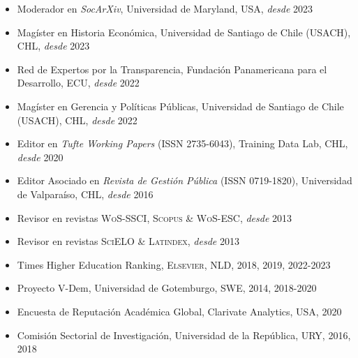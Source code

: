 





\begin{publications}

\begin{itemize}
\item{\small Moderador en {\itshape SocArXiv}, Universidad de Maryland, USA, {\itshape desde} 2023}
\item{\small Magíster en Historia Económica, Universidad de Santiago de Chile (USACH), CHL, {\itshape desde} 2023}
\item{\small Red de Expertos por la Transparencia, Fundación Panamericana para el Desarrollo, ECU, {\itshape desde} 2022}
\item{\small Magíster en Gerencia y Políticas Públicas, Universidad de Santiago de Chile (USACH), CHL, {\itshape desde} 2022}
\item{\small Editor en {\itshape Tufte Working Papers} (ISSN 2735-6043), Training Data Lab, CHL, {\itshape desde} 2020}
\item{\small Editor Asociado en {\itshape Revista de Gestión Pública} (ISSN 0719-1820), Universidad de Valparaíso, CHL, {\itshape desde} 2016}
\item{\small Revisor en revistas {\scshape WoS-SSCI}, {\scshape Scopus} \& {\scshape WoS-ESC}, {\itshape desde} 2013}
\item{\small Revisor en revistas {\scshape SciELO} \& {\scshape Latindex}, {\itshape desde} 2013}
\item{\small Times Higher Education Ranking, {\scshape Elsevier}, NLD, 2018, 2019, 2022-2023}
\item{\small Proyecto V-Dem, Universidad de Gotemburgo, SWE, 2014, 2018-2020}
\item{\small Encuesta de Reputación Académica Global, Clarivate Analytics, USA, 2020}
\item{\small Comisión Sectorial de Investigación, Universidad de la República, URY, 2016, 2018}
\end{itemize}

\vspace{1mm}
\end{publications}
